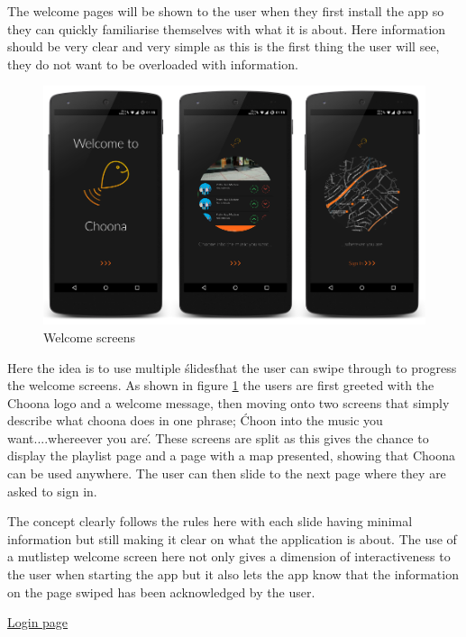 The welcome pages will be shown to the user when they first install the app so they can quickly familiarise themselves with what it is about. Here information should be very clear and very simple as this is the first thing the user will see, they do not want to be overloaded with information. \\

\noindent
\begin{figure}[h!]
\centering
\includegraphics[width=1\textwidth]{./img/welcomeframed.png}
\caption{Welcome screens}
\label{fig:welcomescreens}
\end{figure}

Here the idea is to use multiple \'slides\' that the user can swipe through to progress the welcome screens. As shown in figure \ref{fig:welcomescreens} the users are first greeted with the Choona logo and a welcome message, then moving onto two screens that simply describe what choona does in one phrase; \'Choon into the music you want....whereever you are\'. These screens are split as this gives the chance to display the playlist page and a page with a map presented, showing that Choona can be used anywhere. The user can then slide to the next page where they are asked to sign in. 

The concept clearly follows the rules here with each slide having minimal information but still making it clear on what the application is about. The use of a mutlistep welcome screen here not only gives a dimension of interactiveness to the user when starting the app but it also lets the app know that the information on the page swiped has been acknowledged by the user.  

\newpage

\noindent\underline{Login page}\newline

